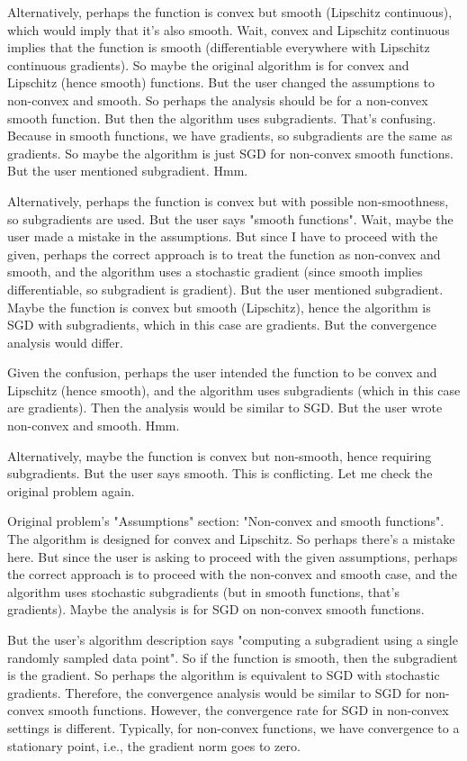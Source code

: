 Alternatively, perhaps the function is convex but smooth (Lipschitz continuous), which would imply that it's also smooth. Wait, convex and Lipschitz continuous implies that the function is smooth (differentiable everywhere with Lipschitz continuous gradients). So maybe the original algorithm is for convex and Lipschitz (hence smooth) functions. But the user changed the assumptions to non-convex and smooth. So perhaps the analysis should be for a non-convex smooth function. But then the algorithm uses subgradients. That's confusing. Because in smooth functions, we have gradients, so subgradients are the same as gradients. So maybe the algorithm is just SGD for non-convex smooth functions. But the user mentioned subgradient. Hmm.

Alternatively, perhaps the function is convex but with possible non-smoothness, so subgradients are used. But the user says "smooth functions". Wait, maybe the user made a mistake in the assumptions. But since I have to proceed with the given, perhaps the correct approach is to treat the function as non-convex and smooth, and the algorithm uses a stochastic gradient (since smooth implies differentiable, so subgradient is gradient). But the user mentioned subgradient. Maybe the function is convex but smooth (Lipschitz), hence the algorithm is SGD with subgradients, which in this case are gradients. But the convergence analysis would differ.

Given the confusion, perhaps the user intended the function to be convex and Lipschitz (hence smooth), and the algorithm uses subgradients (which in this case are gradients). Then the analysis would be similar to SGD. But the user wrote non-convex and smooth. Hmm.

Alternatively, maybe the function is convex but non-smooth, hence requiring subgradients. But the user says smooth. This is conflicting. Let me check the original problem again.

Original problem's "Assumptions" section: "Non-convex and smooth functions". The algorithm is designed for convex and Lipschitz. So perhaps there's a mistake here. But since the user is asking to proceed with the given assumptions, perhaps the correct approach is to proceed with the non-convex and smooth case, and the algorithm uses stochastic subgradients (but in smooth functions, that's gradients). Maybe the analysis is for SGD on non-convex smooth functions.

But the user's algorithm description says "computing a subgradient using a single randomly sampled data point". So if the function is smooth, then the subgradient is the gradient. So perhaps the algorithm is equivalent to SGD with stochastic gradients. Therefore, the convergence analysis would be similar to SGD for non-convex smooth functions. However, the convergence rate for SGD in non-convex settings is different. Typically, for non-convex functions, we have convergence to a stationary point, i.e., the gradient norm goes to zero.

